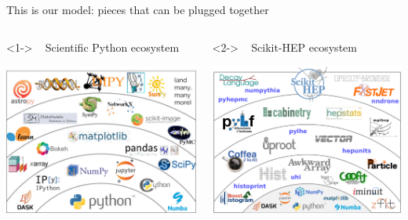 \documentclass[aspectratio=169]{beamer}
\begin{document}
\begin{frame}{This is our model: pieces that can be plugged together}
\vspace{0.75 cm}
\Large

\begin{columns}
\begin{uncoverenv}<1->
\mbox{ } \hfill Scientific Python ecosystem \hfill \mbox{ }

\includegraphics[width=\linewidth]{PLOTS/shells-border.png}
\end{uncoverenv}

\begin{uncoverenv}<2->
\mbox{ } \hfill Scikit-HEP ecosystem \hfill \mbox{ }

\includegraphics[width=\linewidth]{PLOTS/shells-hep.pdf}
\end{uncoverenv}
\end{columns}
\end{frame}
\end{document}
